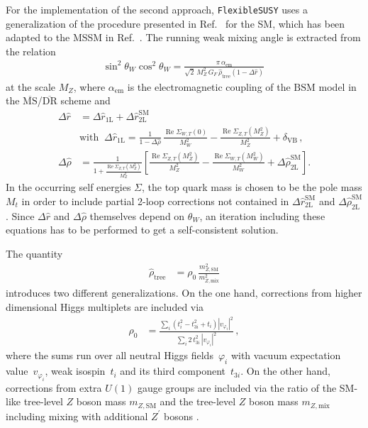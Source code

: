 \documentclass[final,3p,11pt,pdflatex]{elsarticle}
\makeatletter
\newcommand{\fs}{\texttt{FlexibleSUSY}\@\xspace}
\newcommand{\ol}[1]{\overline{#1}}
\newcommand{\MSbar}{\ensuremath{\ol{\text{MS}}}\xspace}
\newcommand{\DRbar}{\ensuremath{\ol{\text{DR}}}\xspace}
\newcommand{\SM}{\ensuremath{\text{SM}}\xspace}
\newcommand{\BSM}{\ensuremath{\text{BSM}}\xspace}
\newcommand{\deltaVB}{\ensuremath{\delta_{\text{VB}}}\xspace}
\DeclareMathOperator{\re}{Re}
\def\aem{\alpha_{\text{em}}}
\makeatother
\begin{document}
For the implementation of the second approach, \fs uses a
generalization of the procedure presented in Ref.~\cite{Degrassi:1990tu}
for the SM, which has been adapted to the MSSM in Ref.~\cite{Pierce:1996zz}.
The running weak mixing angle is extracted from the relation
\cite{Degrassi:1990tu}
%
\begin{align}
  \sin^2\theta_W \cos^2\theta_W =
  \frac{\pi\,\aem}
   {\sqrt{2}\,M_Z^2\,G_F\,\hat\rho_\text{tree} \left(1-\Delta\hat{r}\right)}\,
  \label{eq:muon_decay_master}
\end{align}
%
at the scale $M_Z$,
where $\aem$ is the electromagnetic coupling of the \BSM model in the
\MSbar/\DRbar scheme and
%
\begin{align}
  \Delta\hat{r} &= \Delta\hat{r}_\text{1L} + \Delta\hat{r}_\text{2L}^\SM \\
  &\text{with}\;\;
  \Delta\hat{r}_\text{1L} = \frac{1}{1-\Delta\hat\rho}\,\frac{\re\Sigma_{W,T}(0)}{M_W^2}
  - \frac{\re\Sigma_{Z,T}(M_Z^2)}{M_Z^2} + \deltaVB\,,
  \label{eq:Delta_r_hat}\\
  \Delta\hat\rho &= \frac{1}{1 + \frac{\re\Sigma_{Z,T}(M_Z^2)}{M_Z^2}}
  \left[\frac{\re\Sigma_{Z,T}(M_Z^2)}{M_Z^2} - \frac{\re\Sigma_{W,T}(M_W^2)}{M_W^2}
   + \Delta\hat\rho_\text{2L}^\SM\right].
   \label{eq:Delta_rho_hat}
\end{align}
%
In the occurring self energies $\Sigma$, the top quark mass is chosen
to be the pole mass $M_t$ in order to include partial 2-loop corrections not
contained in $\Delta\hat{r}_\text{2L}^\SM$ and $\Delta\hat\rho_\text{2L}^\SM$
\cite{Fanchiotti:1992tu}.
Since $\Delta\hat{r}$ and $\Delta\hat\rho$ themselves depend
on $\theta_W$, an iteration including these equations has to be
performed to get a self-consistent solution.

The quantity
%
\begin{align}
  \hat\rho_\text{tree} &= \rho_0\,\frac{m_{Z,\SM}^2}{m_{Z,\text{mix}}^2}
  \label{eq:rho_hat_tree}
\end{align}
%
introduces two different generalizations. On the one hand, corrections
from higher dimensional Higgs multiplets are included via \cite{Langacker:1991an}
%
\begin{align}
  \rho_0 &= \frac{\sum_i \left(t_i^2 - t_{3i}^2 + t_i \right)|v_{\varphi_i}|^2}
   {\sum_i 2\,t_{3i}^2\,|v_{\varphi_i}|^2}\,,
\end{align}
%
where the sums run over all neutral Higgs fields~$\varphi_i$ with vacuum
expectation value~$v_{\varphi_i}$, weak isospin~$t_i$ and its third
component~$t_{3i}$. On the other hand, corrections from extra $U(1)$
gauge groups are included via the ratio of the SM-like tree-level $Z$
boson mass $m_{Z,\SM}$ and the tree-level $Z$ boson mass $m_{Z,\text{mix}}$
including mixing with additional $Z^\prime$ bosons
\cite{Degrassi:1989mu,Leike:1991if}.
\end{document}
